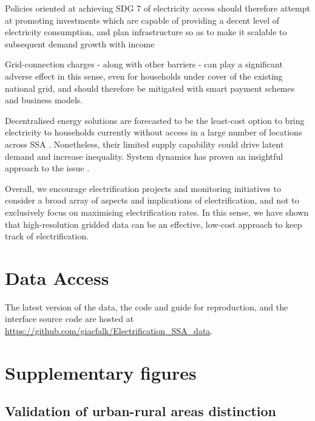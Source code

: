 \documentclass[preprint,12pt]{elsarticle}
\begin{document}
Policies oriented at achieving SDG 7 of electricity access should therefore attempt at promoting investments which are capable of providing a decent level of electricity consumption, and plan infrastructure so as to make it scalable to subsequent demand growth with income \citep{bazilian_energy_2012}

Grid-connection charges - along with other barriers \citep{lee_barriers_2014} - can play a significant adverse effect in this sense, even for households under cover of the existing national grid, and should therefore be mitigated with smart payment schemes \citep{golumbeanu_connection_2013} and business models. 

Decentralised energy solutions are forecasted to be the least-cost option to bring electricity to households currently without access in a large number of locations across SSA \citep{dagnachew_role_2017}. Nonetheless, their limited supply capability could drive latent demand and increase inequality. System dynamics has proven an insightful approach to the issue \citep{riva_merry-go-round_2018}. 

Overall, we encourage electrification projects and monitoring initiatives to consider a broad array of aspects and implications of electrification, and not to exclusively focus on maximising electrification rates. In this sense, we have shown that high-resolution gridded data can be an effective, low-cost approach to keep track of electrification. 

\section*{Data Access}
The latest version of the data, the code and guide for reproduction, and the interface source code are hosted at \url{https://github.com/giacfalk/Electrification_SSA_data}.

\section*{Supplementary figures}
\renewcommand{\thefigure}{A.\arabic{figure}}
\setcounter{figure}{0}
\subsection*{Validation of urban-rural areas distinction}
\end{document}
